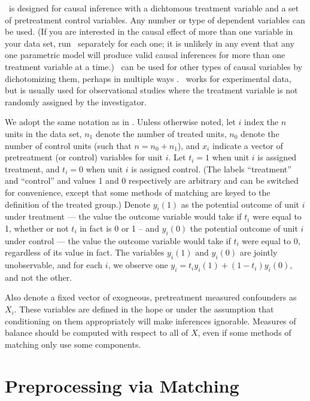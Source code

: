 
\MatchIt\ is designed for causal inference with a dichtomous treatment
variable and a set of pretreatment control variables.  Any number or
type of dependent variables can be used.  (If you are interested in
the causal effect of more than one variable in your data set, run
\MatchIt\ separately for each one; it is unlikely in any event that
any one parametric model will produce valid causal inferences for more
than one treatment variable at a time.)  \MatchIt\ can be used for
other types of causal variables by dichotomizing them, perhaps in
multiple ways \citep[see also][]{ImaDyk04}.  \MatchIt\ works for
experimental data, but is usually used for observational studies where
the treatment variable is not randomly assigned by the investigator.

We adopt the same notation as in \citet*{HoImaKin07}.  Unless
otherwise noted, let $i$ index the $n$ units in the data set, $n_1$
denote the number of treated units, $n_0$ denote the number of control
units (such that $n=n_0+n_1$), and $x_i$ indicate a vector of
pretreatment (or control) variables for unit $i$.  Let $t_i=1$ when
unit $i$ is assigned treatment, and $t_i=0$ when unit $i$ is assigned
control.  (The labels ``treatment'' and ``control'' and values 1 and 0
respectively are arbitrary and can be switched for convenience, except
that some methods of matching are keyed to the definition of the
treated group.)  Denote $y_i(1)$ as the potential outcome of unit $i$
under treatment --- the value the outcome variable would take if $t_i$
were equal to 1, whether or not $t_i$ in fact is 0 or 1 -- and
$y_i(0)$ the potential outcome of unit $i$ under control --- the value
the outcome variable would take if $t_i$ were equal to 0, regardless
of its value in fact.  The variables $y_i(1)$ and $y_i(0)$ are jointly
unobservable, and for each $i$, we observe one
$y_i=t_iy_i(1)+(1-t_i)y_i(0)$, and not the other.  

Also denote a fixed vector of exogneous, pretreatment measured
confounders as $X_i$.  These variables are defined in the hope or
under the assumption that conditioning on them appropriately will make
inferences ignorable.  Measures of balance should be computed with
respect to all of $X$, even if some methods of matching only use some
components.

\section{Preprocessing via Matching}

